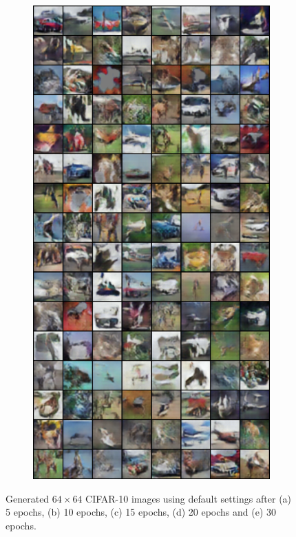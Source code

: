 \begin{figure}[H]
    \begin{subfigure}{0.2\textwidth}
        \centering
        \includegraphics[width=0.95\linewidth]{cifar10/64_nz100/fake_sample_epoch_0030.png}
        \caption{}
        \label{subfig:cifar10/64_nz100/fake_sample_epoch_0030}
    \end{subfigure}

    \caption{Generated $64 \times 64$ CIFAR-10 images using default settings after (a) 5 epochs, (b) 10 epochs, (c) 15 epochs, (d) 20 epochs and (e) 30 epochs.}
    \label{fig:cifar10_64_images}
\end{figure}

